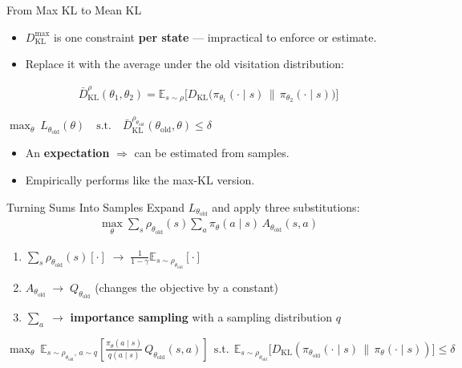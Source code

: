 \documentclass[aspectratio=169]{beamer}
\newcommand{\E}{\mathbb{E}}
\newcommand{\DKL}{D_{\mathrm{KL}}}
\newcommand{\told}{\theta_{\mathrm{old}}}
\begin{document}
\begin{frame}{From Max KL to Mean KL}
  \begin{itemize}
    \item $\DKL^{\max}$ is one constraint \textbf{per state} --- impractical to enforce or estimate.
    \item Replace it with the average under the old visitation distribution:
  \end{itemize}
  \begin{gather*}
    \bar D_{\mathrm{KL}}^{\rho}(\theta_1,\theta_2) = \E_{s\sim\rho}\Big[\DKL\big(\pi_{\theta_1}(\cdot\mid s)\,\|\,\pi_{\theta_2}(\cdot\mid s)\big)\Big]
  \end{gather*}
  \begin{formulabox}
    $\displaystyle \max_\theta\ L_{\told}(\theta) \quad\text{s.t.}\quad \bar D_{\mathrm{KL}}^{\rho_{\told}}(\told,\theta) \le \delta$
  \end{formulabox}
  \begin{itemize}
    \item An \textbf{expectation} $\Rightarrow$ can be estimated from samples.
    \item Empirically performs like the max-KL version.
  \end{itemize}
\end{frame}

\begin{frame}{Turning Sums Into Samples}
  Expand $L_{\told}$ and apply three substitutions:
  \begin{gather*}
    \max_\theta \sum_s \rho_{\told}(s) \sum_a \pi_\theta(a\mid s)\, A_{\told}(s,a)
  \end{gather*}
  \begin{enumerate}
    \item $\sum_s \rho_{\told}(s)[\cdot] \;\to\; \frac{1}{1-\gamma}\E_{s\sim\rho_{\told}}[\cdot]$
    \item $A_{\told} \;\to\; Q_{\told}$ \hfill {\small(changes the objective by a constant)}
    \item $\sum_a \;\to$ \textbf{importance sampling} with a sampling distribution $q$
  \end{enumerate}
  \begin{formulabox}
    $\displaystyle \max_\theta\ \E_{s\sim\rho_{\told},\,a\sim q}\!\left[\frac{\pi_\theta(a\mid s)}{q(a\mid s)}\,Q_{\told}(s,a)\right]
    \ \ \text{s.t.}\ \ \E_{s\sim\rho_{\told}}\!\big[\DKL(\pi_{\told}(\cdot\mid s)\,\|\,\pi_\theta(\cdot\mid s))\big] \le \delta$
  \end{formulabox}
\end{frame}
\end{document}
